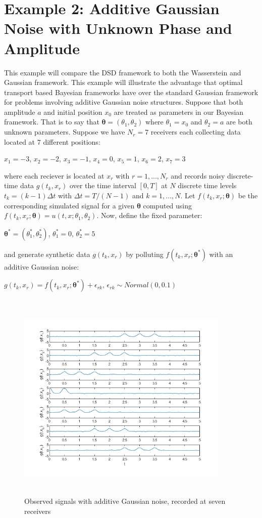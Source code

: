 \documentclass[botnum, fleqn]{unmeethesis}
\begin{document}
\section{\label{section:Example 2: Additive Gaussian Noise with Unknown Phase and Amplitude}Example 2: Additive Gaussian Noise with Unknown Phase and Amplitude}
This example will compare the DSD framework to both the Wasserstein and Gaussian framework. This example will illustrate the advantage that optimal transport based Bayesian frameworks have over the standard Gaussian framework for problems involving additive Gaussian noise structures. Suppose that both amplitude $a$ and initial position $x_0$ are treated as parameters in our Bayesian framework. That is to say that $\bm{\theta}=(\theta_1,\theta_2)$ where $\theta_1=x_0$ and $\theta_2=a$ are both unknown parameters. Suppose we have $N_r=7$ receivers each collecting data located at 7 different positions:
\begin{center}
	$x_1=-3$, $x_2=-2$, $x_3=-1$, $x_4=0$, $x_5=1$, $x_6=2$, $x_7=3$
\end{center}
where each reciever is located at $x_r$ with $r=1,...,N_r$ and records noisy discrete-time data $g(t_k,x_r)$ over the time interval $[0,T]$ at $N$ discrete time levels $t_k=(k-1)\Delta t$ with $\Delta t=T/(N-1)$ and $k=1,...,N$. Let $f(t_k,x_r;\bm{\theta})$ be the corresponding simulated signal for a given $\bm{\theta}$ computed using $f(t_k,x_r;\bm{\theta})=u(t,x;\theta_1,\theta_2)$. Now, define the fixed parameter:
\begin{center}
	$\bm{\theta^*}=(\theta_1^*,\theta_2^*)$, \hspace{1cm} $\theta_1^*=0$, \hspace{1cm} $\theta_2^*=5$
\end{center}
and generate synthetic data $g(t_k,x_r)$ by polluting $f(t_k,x_r;\bm{\theta^*})$ with an additive Gaussian noise:
\begin{center}
	$g(t_k,x_r)=f(t_k,x_r;\bm{\theta^*})+\epsilon_{rk}$, \hspace{1cm} $\epsilon_{rk}\sim Normal(0,0.1)$
\end{center}
\begin{figure}[H]
	\centering
	\includegraphics[width=4in,height=4in]{noiseData2.png}
	\caption{Observed signals with additive Gaussian noise, recorded at seven receivers}
\end{figure}
\end{document}
